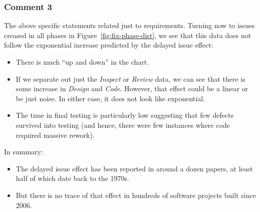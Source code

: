 \documentclass{sig-alternate}
\newcommand{\bi}{\begin{itemize}}%
\newcommand{\ei}{\end{itemize}}
\newcommand{\fig}[1]{Figure~\ref{fig:#1}}
\begin{document}
 \subsubsection{Comment 3}
 The above specific statements related just to requirements. Turning now
 to issues creased in all phases in Figure~\ref{fig:fix-phase-dist},  we see that
 this data does not follow the exponential increase predicted
by the delayed issue effect:
\bi
\item There is much ``up and down'' in the chart. 
\item If we separate out just the {\em Inspect} or {\em Review} data, we can see that there is some increase in {\em Design} and {\em Code}. However, that effect could be a linear or be just noise. In either case,
it does not look like exponential.
\item The time in final testing is particularly low suggesting that few defects survived into testing
(and hence, there were few instances where code required massive rework).
\ei
In summary:
\bi
\item
The delayed issue effect has been reported in around a dozen papers, at least half of which date back to the 1970s. 
\item
But there is no trace of that  effect   in hundreds of software projects built  since 2006.
\ei
 


 
 
\end{document}
